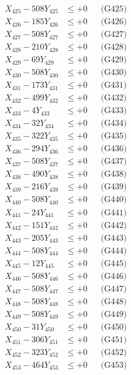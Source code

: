 \documentclass[a4paper,10pt]{article}
\begin{document}
{\begin{align}
X_{425} - 508Y_{425} &\leq +0 && \text{(G425)} \\
X_{426} - 185Y_{426} &\leq +0 && \text{(G426)} \\
X_{427} - 508Y_{427} &\leq +0 && \text{(G427)} \\
X_{428} - 210Y_{428} &\leq +0 && \text{(G428)} \\
X_{429} - 69Y_{429} &\leq +0 && \text{(G429)} \\
X_{430} - 508Y_{430} &\leq +0 && \text{(G430)} \\
\allowbreak
X_{431} - 173Y_{431} &\leq +0 && \text{(G431)} \\
X_{432} - 499Y_{432} &\leq +0 && \text{(G432)} \\
X_{433} - 4Y_{433} &\leq +0 && \text{(G433)} \\
X_{434} - 32Y_{434} &\leq +0 && \text{(G434)} \\
X_{435} - 322Y_{435} &\leq +0 && \text{(G435)} \\
X_{436} - 294Y_{436} &\leq +0 && \text{(G436)} \\
X_{437} - 508Y_{437} &\leq +0 && \text{(G437)} \\
X_{438} - 490Y_{438} &\leq +0 && \text{(G438)} \\
X_{439} - 216Y_{439} &\leq +0 && \text{(G439)} \\
X_{440} - 508Y_{440} &\leq +0 && \text{(G440)} \\
\allowbreak
X_{441} - 24Y_{441} &\leq +0 && \text{(G441)} \\
X_{442} - 151Y_{442} &\leq +0 && \text{(G442)} \\
X_{443} - 205Y_{443} &\leq +0 && \text{(G443)} \\
X_{444} - 508Y_{444} &\leq +0 && \text{(G444)} \\
X_{445} - 12Y_{445} &\leq +0 && \text{(G445)} \\
X_{446} - 508Y_{446} &\leq +0 && \text{(G446)} \\
X_{447} - 508Y_{447} &\leq +0 && \text{(G447)} \\
X_{448} - 508Y_{448} &\leq +0 && \text{(G448)} \\
X_{449} - 508Y_{449} &\leq +0 && \text{(G449)} \\
X_{450} - 31Y_{450} &\leq +0 && \text{(G450)} \\
\allowbreak
X_{451} - 306Y_{451} &\leq +0 && \text{(G451)} \\
X_{452} - 323Y_{452} &\leq +0 && \text{(G452)} \\
X_{453} - 464Y_{453} &\leq +0 && \text{(G453)} \\

\end{align}}
\end{document}
